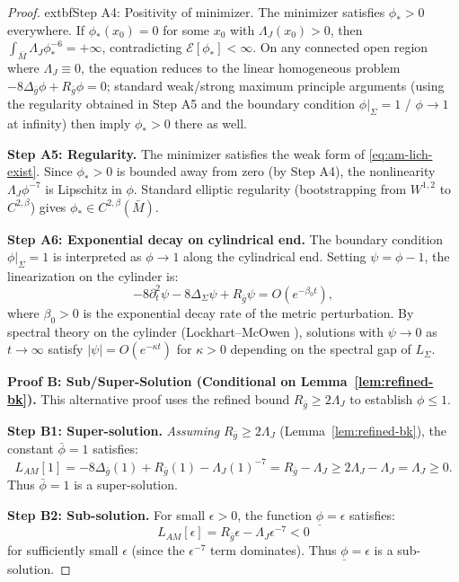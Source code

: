 \documentclass[12pt]{article}
\theoremstyle{plain}
\theoremstyle{definition}
\theoremstyle{remark}
\newcommand{\bg}{\bar{g}}
\newcommand{\bM}{\bar{M}}
\newcommand{\Hoelder}{\beta}
\begin{document}
\begin{proof}
	extbf{Step A4: Positivity of minimizer.} The minimizer satisfies $\phi_* > 0$ everywhere. If $\phi_*(x_0) = 0$ for some $x_0$ with $\Lambda_J(x_0) > 0$, then $\int_{\bM} \Lambda_J \phi_*^{-6} = +\infty$, contradicting $\mathcal{E}[\phi_*] < \infty$. On any connected open region where $\Lambda_J \equiv 0$, the equation reduces to the linear homogeneous problem $-8\Delta_{\bg}\phi + R_{\bg}\phi = 0$; standard weak/strong maximum principle arguments (using the regularity obtained in Step A5 and the boundary condition $\phi|_\Sigma=1$ / $\phi\to 1$ at infinity) then imply $\phi_* > 0$ there as well.

\textbf{Step A5: Regularity.} The minimizer satisfies the weak form of \eqref{eq:am-lich-exist}. Since $\phi_* > 0$ is bounded away from zero (by Step A4), the nonlinearity $\Lambda_J\phi^{-7}$ is Lipschitz in $\phi$. Standard elliptic regularity (bootstrapping from $W^{1,2}$ to $C^{2,\beta}$) gives $\phi_* \in C^{2,\Hoelder}(\bM)$.

\textbf{Step A6: Exponential decay on cylindrical end.} The boundary condition $\phi|_\Sigma = 1$ is interpreted as $\phi \to 1$ along the cylindrical end. Setting $\psi = \phi - 1$, the linearization on the cylinder is:
\[
-8\partial_t^2\psi - 8\Delta_\Sigma\psi + R_{\bg}\psi = O(e^{-\beta_0 t}),
\]
where $\beta_0 > 0$ is the exponential decay rate of the metric perturbation. By spectral theory on the cylinder (Lockhart--McOwen \cite{lockhartmccowen1985}), solutions with $\psi \to 0$ as $t \to \infty$ satisfy $|\psi| = O(e^{-\kappa t})$ for $\kappa > 0$ depending on the spectral gap of $L_\Sigma$.

\textbf{Proof B: Sub/Super-Solution (Conditional on Lemma~\ref{lem:refined-bk}).}
This alternative proof uses the refined bound $R_{\bg} \geq 2\Lambda_J$ to establish $\phi \leq 1$.

\textbf{Step B1: Super-solution.} \textit{Assuming} $R_{\bg} \geq 2\Lambda_J$ (Lemma~\ref{lem:refined-bk}), the constant $\bar{\phi} = 1$ satisfies:
\[
L_{AM}[1] = -8\Delta_{\bg}(1) + R_{\bg}(1) - \Lambda_J (1)^{-7} = R_{\bg} - \Lambda_J \geq 2\Lambda_J - \Lambda_J = \Lambda_J \geq 0.
\]
Thus $\bar{\phi} = 1$ is a super-solution.

\textbf{Step B2: Sub-solution.} For small $\epsilon > 0$, the function $\underline{\phi} = \epsilon$ satisfies:
\[
L_{AM}[\epsilon] = R_{\bg}\epsilon - \Lambda_J \epsilon^{-7} < 0
\]
for sufficiently small $\epsilon$ (since the $\epsilon^{-7}$ term dominates). Thus $\underline{\phi} = \epsilon$ is a sub-solution.


\end{proof}
\end{document}
